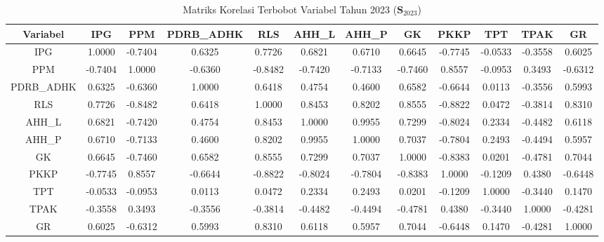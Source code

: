 \begin{table}[H]
\centering
\caption{Matriks Korelasi Terbobot Variabel Tahun 2023 ($\mathbf{S}_{2023}$)} \label{tab:app1matriks_intra_loading_2023}
\begin{adjustbox}{max width=\textwidth, max height=0.85\textheight}
\begin{tabular}{|c|c|c|c|c|c|c|c|c|c|c|c|}
\hline
\textbf{Variabel} & \textbf{IPG} & \textbf{PPM} & \textbf{PDRB\_ADHK} & \textbf{RLS} & \textbf{AHH\_L} & \textbf{AHH\_P} & \textbf{GK} & \textbf{PKKP} & \textbf{TPT} & \textbf{TPAK} & \textbf{GR} \\
\hline
IPG & 1.0000 & -0.7404 & 0.6325 & 0.7726 & 0.6821 & 0.6710 & 0.6645 & -0.7745 & -0.0533 & -0.3558 & 0.6025 \\
PPM & -0.7404 & 1.0000 & -0.6360 & -0.8482 & -0.7420 & -0.7133 & -0.7460 & 0.8557 & -0.0953 & 0.3493 & -0.6312 \\
PDRB\_ADHK & 0.6325 & -0.6360 & 1.0000 & 0.6418 & 0.4754 & 0.4600 & 0.6582 & -0.6644 & 0.0113 & -0.3556 & 0.5993 \\
RLS & 0.7726 & -0.8482 & 0.6418 & 1.0000 & 0.8453 & 0.8202 & 0.8555 & -0.8822 & 0.0472 & -0.3814 & 0.8310 \\
AHH\_L & 0.6821 & -0.7420 & 0.4754 & 0.8453 & 1.0000 & 0.9955 & 0.7299 & -0.8024 & 0.2334 & -0.4482 & 0.6118 \\
AHH\_P & 0.6710 & -0.7133 & 0.4600 & 0.8202 & 0.9955 & 1.0000 & 0.7037 & -0.7804 & 0.2493 & -0.4494 & 0.5957 \\
GK & 0.6645 & -0.7460 & 0.6582 & 0.8555 & 0.7299 & 0.7037 & 1.0000 & -0.8383 & 0.0201 & -0.4781 & 0.7044 \\
PKKP & -0.7745 & 0.8557 & -0.6644 & -0.8822 & -0.8024 & -0.7804 & -0.8383 & 1.0000 & -0.1209 & 0.4380 & -0.6448 \\
TPT & -0.0533 & -0.0953 & 0.0113 & 0.0472 & 0.2334 & 0.2493 & 0.0201 & -0.1209 & 1.0000 & -0.3440 & 0.1470 \\
TPAK & -0.3558 & 0.3493 & -0.3556 & -0.3814 & -0.4482 & -0.4494 & -0.4781 & 0.4380 & -0.3440 & 1.0000 & -0.4281 \\
GR & 0.6025 & -0.6312 & 0.5993 & 0.8310 & 0.6118 & 0.5957 & 0.7044 & -0.6448 & 0.1470 & -0.4281 & 1.0000 \\
\hline
\end{tabular}
\end{adjustbox}
\end{table}